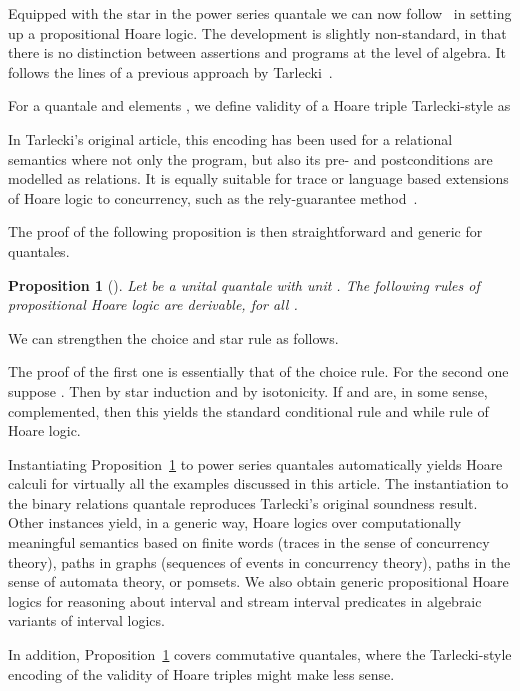 \documentclass[12pt]{article}
\newtheorem{proposition}{Proposition}
\theoremstyle{definition}
\begin{document}
Equipped with the star in the power series quantale we can now
follow~\cite{HMSW11} in setting up a propositional Hoare logic. The
development is slightly non-standard, in that there is no distinction
between assertions and programs at the level of algebra. It follows
the lines of a previous approach by Tarlecki~\cite{tarlecki}.
 
For a quantale  and elements , we define validity of a
Hoare triple Tarlecki-style as

In Tarlecki's original article, this encoding has been used for a
relational semantics where not only the program, but also its pre- and
postconditions are modelled as relations.  It is equally suitable for
trace or language based extensions of Hoare logic to concurrency, such
as the rely-guarantee method~\cite{Jon83}.

The proof of the following proposition is then straightforward and
generic for quantales.
\begin{proposition}[\cite{HMSW11}]\label{prop:phl}
  Let  be a unital quantale with unit . The following
  rules of propositional Hoare logic are derivable, for all
  .
  
\end{proposition}
We can strengthen the choice and star rule  as follows.

The proof of the first one is essentially that of the choice rule. For
the second one suppose . Then  by star induction and  by isotonicity. If  and 
are, in some sense, complemented, then this yields the standard
conditional rule and while rule of Hoare logic.

Instantiating Proposition~\ref{prop:phl} to power series quantales
automatically yields Hoare calculi for virtually all the examples
discussed in this article. The instantiation to the binary relations
quantale reproduces Tarlecki's original soundness result. Other
instances yield, in a generic way, Hoare logics over computationally
meaningful semantics based on finite words (traces in the sense of
concurrency theory), paths in graphs (sequences of events in
concurrency theory), paths in the sense of automata theory, or
pomsets. We also obtain generic propositional Hoare logics for
reasoning about interval and stream interval predicates in algebraic
variants of interval logics.



In addition, Proposition~\ref{prop:phl} covers commutative quantales,
where the Tarlecki-style encoding of the validity of Hoare triples
might make less sense. 
\end{document}
